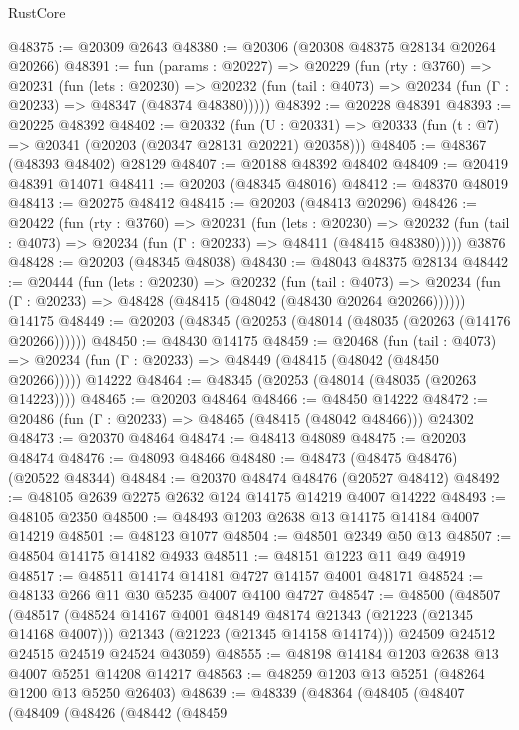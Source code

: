 \begin{lexlean}{RustCore}
\begin{coremodule}
@48375 := @20309 @2643
@48380 := @20306 (@20308 @48375 @28134 @20264 @20266)
@48391 := fun (params : @20227) =>
  @20229
    (fun (rty : @3760) =>
    @20231
      (fun (lets : @20230) =>
      @20232 (fun (tail : @4073) => @20234 (fun (Γ : @20233) => @48347 (@48374 @48380)))))
@48392 := @20228 @48391
@48393 := @20225 @48392
@48402 := @20332
    (fun (U : @20331) => @20333 (fun (t : @7) => @20341 (@20203 (@20347 @28131 @20221) @20358)))
@48405 := @48367 (@48393 @48402) @28129
@48407 := @20188 @48392 @48402
@48409 := @20419 @48391 @14071
@48411 := @20203 (@48345 @48016)
@48412 := @48370 @48019
@48413 := @20275 @48412
@48415 := @20203 (@48413 @20296)
@48426 := @20422
    (fun (rty : @3760) =>
    @20231
      (fun (lets : @20230) =>
      @20232 (fun (tail : @4073) => @20234 (fun (Γ : @20233) => @48411 (@48415 @48380)))))
    @3876
@48428 := @20203 (@48345 @48038)
@48430 := @48043 @48375 @28134
@48442 := @20444
    (fun (lets : @20230) =>
    @20232
      (fun (tail : @4073) =>
      @20234 (fun (Γ : @20233) => @48428 (@48415 (@48042 (@48430 @20264 @20266))))))
    @14175
@48449 := @20203 (@48345 (@20253 (@48014 (@48035 (@20263 (@14176 @20266))))))
@48450 := @48430 @14175
@48459 := @20468
    (fun (tail : @4073) => @20234 (fun (Γ : @20233) => @48449 (@48415 (@48042 (@48450 @20266)))))
    @14222
@48464 := @48345 (@20253 (@48014 (@48035 (@20263 @14223))))
@48465 := @20203 @48464
@48466 := @48450 @14222
@48472 := @20486 (fun (Γ : @20233) => @48465 (@48415 (@48042 @48466))) @24302
@48473 := @20370 @48464
@48474 := @48413 @48089
@48475 := @20203 @48474
@48476 := @48093 @48466
@48480 := @48473 (@48475 @48476) (@20522 @48344)
@48484 := @20370 @48474 @48476 (@20527 @48412)
@48492 := @48105 @2639 @2275 @2632 @124 @14175 @14219 @4007 @14222
@48493 := @48105 @2350
@48500 := @48493 @1203 @2638 @13 @14175 @14184 @4007 @14219
@48501 := @48123 @1077
@48504 := @48501 @2349 @50 @13
@48507 := @48504 @14175 @14182 @4933
@48511 := @48151 @1223 @11 @49 @4919
@48517 := @48511 @14174 @14181 @4727 @14157 @4001 @48171
@48524 := @48133 @266 @11 @30 @5235 @4007 @4100 @4727
@48547 := @48500
    (@48507
      (@48517
        (@48524 @14167 @4001 @48149 @48174 @21343 (@21223 (@21345 @14168 @4007)))
        @21343
        (@21223 (@21345 @14158 @14174)))
      @24509
      @24512
      @24515
      @24519
      @24524
      @43059)
@48555 := @48198 @14184 @1203 @2638 @13 @4007 @5251 @14208 @14217
@48563 := @48259 @1203 @13 @5251 (@48264 @1200 @13 @5250 @26403)
@48639 := @48339
    (@48364
      (@48405
        (@48407
          (@48409
            (@48426
              (@48442
                (@48459

\end{coremodule}
\end{lexlean}
